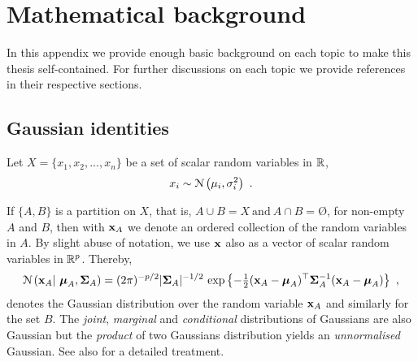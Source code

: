 \chapter{Mathematical background}
\ifpdf
    \graphicspath{{Appendix1/Appendix1Figs/PNG/}{Appendix1/Appendix1Figs/PDF/}{Appendix1/Appendix1Figs/}}
\else
    \graphicspath{{Appendix1/Appendix1Figs/EPS/}{Appendix1/Appendix1Figs/}}
\fi
  In this appendix we provide enough basic background on each topic to make this thesis self-contained. For further discussions on each topic we provide references in their respective sections.




  \section{Gaussian identities}	\label{sec:app1_Gaussian_identities}

    Let $X = \{x_1, x_2, ..., x_n \}$ be a set of scalar random variables in $\mathbb{R}$,
    \[
      x_i \sim \mathcal{N} \left( \mu_i, \sigma^2_i \right) ~.
    \]

    If $\{A,B\}$ is a partition on $X$, that is, $A \cup B = X ~ \textrm{and} ~ A \cap B = \textrm{\O}$, for non-empty $A$ and $B$, then with $\mathbf{x}_A$ we denote an ordered collection of the random variables in $A$. By slight abuse of notation, we use $\mathbf{x}$ also as a vector of scalar random variables in $\mathbb{R}^p$. Thereby,
    \[
      \mathcal{N} \left( \mathbf{x}_A |~ \boldsymbol{\mu}_{A}, \mathbf{\Sigma}_{A} \right)
      = (2\pi)^{-p/2} \lvert \mathbf{\Sigma}_A \rvert^{-1/2} ~\textrm{exp}\left\{ -\tfrac{1}{2} (\mathbf{x}_A - \boldsymbol{\mu}_A)^\top\mathbf{\Sigma}^{-1}_A(\mathbf{x}_A - \boldsymbol{\mu}_A) \right\} ~,
    \]
    denotes the Gaussian distribution over the random variable $\mathbf{x}_A$ and similarly for the set $B$. The \textit{joint}, \textit{marginal} and \textit{conditional} distributions of Gaussians are also Gaussian but the \emph{product} of two Gaussians distribution yields an \emph{unnormalised} Gaussian. See also \citep{vonMises:mathematical64, Bishop:book06} for a detailed treatment.


